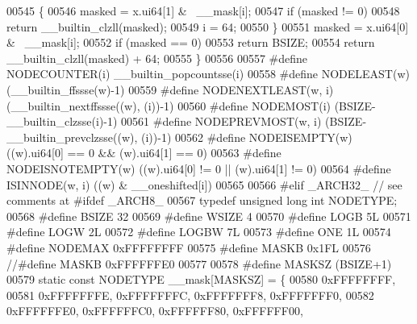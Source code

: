 \begin{DoxyCode}
00545         \{
00546                 masked = x.ui64[1] & ~\_\_mask[i];
00547                 \textcolor{keywordflow}{if} (masked != 0)
00548                         \textcolor{keywordflow}{return} \_\_builtin\_clzll(masked);
00549                 i = 64;
00550         \}
00551         masked = x.ui64[0] & ~\_\_mask[i];
00552         \textcolor{keywordflow}{if} (masked == 0)
00553                 \textcolor{keywordflow}{return} BSIZE;
00554         \textcolor{keywordflow}{return} \_\_builtin\_clzll(masked) + 64;
00555 \}
00556 
00557 \textcolor{preprocessor}{#define NODECOUNTER(i) \_\_builtin\_popcountsse(i)}
00558 \textcolor{preprocessor}{#define NODELEAST(w) (\_\_builtin\_ffssse(w)-1)}
00559 \textcolor{preprocessor}{#define NODENEXTLEAST(w, i) (\_\_builtin\_nextffssse((w), (i))-1)}
00560 \textcolor{preprocessor}{#define NODEMOST(i) (BSIZE-\_\_builtin\_clzsse(i)-1)}
00561 \textcolor{preprocessor}{#define NODEPREVMOST(w, i) (BSIZE-\_\_builtin\_prevclzsse((w), (i))-1)}
00562 \textcolor{preprocessor}{#define NODEISEMPTY(w) ((w).ui64[0] == 0 && (w).ui64[1] == 0)}
00563 \textcolor{preprocessor}{#define NODEISNOTEMPTY(w) ((w).ui64[0] != 0 || (w).ui64[1] != 0)}
00564 \textcolor{preprocessor}{#define ISINNODE(w, i) ((w) & \_\_oneshifted[i])                                                  }
00565 \textcolor{preprocessor}{}
00566 \textcolor{preprocessor}{#elif \_ARCH32\_  // see comments at #ifdef \_ARCH8\_}
00567 \textcolor{keyword}{typedef} \textcolor{keywordtype}{unsigned} \textcolor{keywordtype}{long} \textcolor{keywordtype}{int} NODETYPE; 
00568 \textcolor{preprocessor}{#define BSIZE 32                                        }
00569 \textcolor{preprocessor}{#define WSIZE 4                                         }
00570 \textcolor{preprocessor}{#define LOGB 5L                                         }
00571 \textcolor{preprocessor}{#define LOGW 2L                                         }
00572 \textcolor{preprocessor}{#define LOGBW 7L                                        }
00573 \textcolor{preprocessor}{#define ONE 1L                                          }
00574 \textcolor{preprocessor}{#define NODEMAX 0xFFFFFFFF                      }
00575 \textcolor{preprocessor}{#define MASKB 0x1FL                                     }
00576 \textcolor{preprocessor}{//#define MASKB 0xFFFFFFE0}
00577 
00578 \textcolor{preprocessor}{#define MASKSZ (BSIZE+1)                        }
00579 \textcolor{preprocessor}{static const NODETYPE \_\_mask[MASKSZ] = \{}
00580         0xFFFFFFFF,
00581         0xFFFFFFFE, 0xFFFFFFFC, 0xFFFFFFF8, 0xFFFFFFF0,
00582         0xFFFFFFE0, 0xFFFFFFC0, 0xFFFFFF80, 0xFFFFFF00,

\end{DoxyCode}
